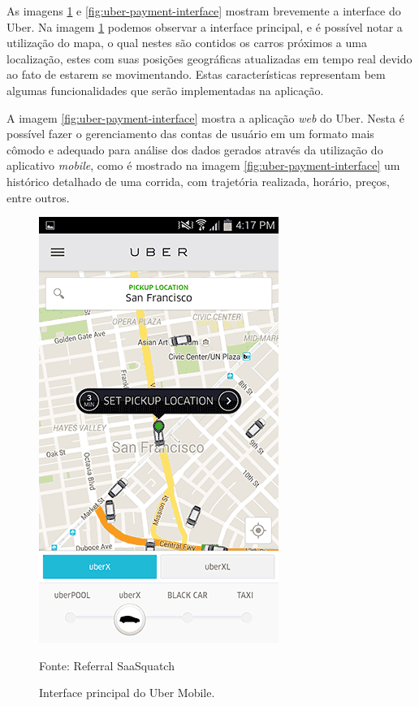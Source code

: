 As imagens \ref{fig:uber-main-interface} e \ref{fig:uber-payment-interface} mostram brevemente a interface do Uber. Na imagem \ref{fig:uber-main-interface} podemos observar a interface principal, e é possível notar a utilização do mapa, o qual nestes são contidos os carros próximos a uma localização, estes com suas posições geográficas atualizadas em tempo real devido ao fato de estarem se movimentando. Estas características representam bem algumas funcionalidades que serão implementadas na aplicação.

A imagem \ref{fig:uber-payment-interface} mostra a aplicação \textit{web} do Uber. Nesta é possível fazer o gerenciamento das contas de usuário em um formato mais cômodo e adequado para análise dos dados gerados através da utilização do aplicativo \textit{mobile}, como é mostrado na imagem \ref{fig:uber-payment-interface} um histórico detalhado de uma corrida, com trajetória realizada, horário, preços, entre outros.

\begin{figure}[H]
	\centering
	\includegraphics[scale=0.6]{imagens/uber.png}
	\caption{\small Interface principal do Uber Mobile.} Fonte: Referral SaaSquatch \cite{uber-imgs}
	\label{fig:uber-main-interface}
\end{figure}

